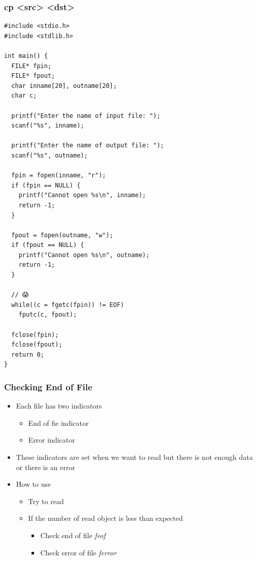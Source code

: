 \documentclass{../c-lecture}
\begin{document}
\begin{frame}[fragile]
  \frametitle{cp <src> <dst>}
  \scriptsize
  \begin{verbatim}
#include <stdio.h>
#include <stdlib.h>

int main() {
  FILE* fpin;
  FILE* fpout;
  char inname[20], outname[20];
  char c;

  printf("Enter the name of input file: ");
  scanf("%s", inname);

  printf("Enter the name of output file: ");
  scanf("%s", outname);

  fpin = fopen(inname, "r");
  if (fpin == NULL) {
    printf("Cannot open %s\n", inname);
    return -1;
  }

  fpout = fopen(outname, "w");
  if (fpout == NULL) {
    printf("Cannot open %s\n", outname);
    return -1;
  }

  // 😱
  while((c = fgetc(fpin)) != EOF)
    fputc(c, fpout);

  fclose(fpin);
  fclose(fpout);
  return 0;
}
  \end{verbatim}
\end{frame}

\begin{frame}
  \frametitle{Checking End of File}
  \begin{itemize}
    \item Each file has two indicators
    \begin{itemize}
      \item End of fie indicator
      \item Error indicator
    \end{itemize}
    \item
      These indicators are set when we want to read but there is not enough
      data or there is an error
    \item How to use
    \begin{itemize}
      \item Try to read
      \item If the number of read object is less than expected
      \begin{itemize}
        \item Check end of file \textrightarrow \textit{\color{YellowOrange} feof}
        \item Check error of file \textrightarrow \textit{\color{LimeGreen} ferror}
      \end{itemize}
    \end{itemize}
  \end{itemize}
\end{frame}
\end{document}
